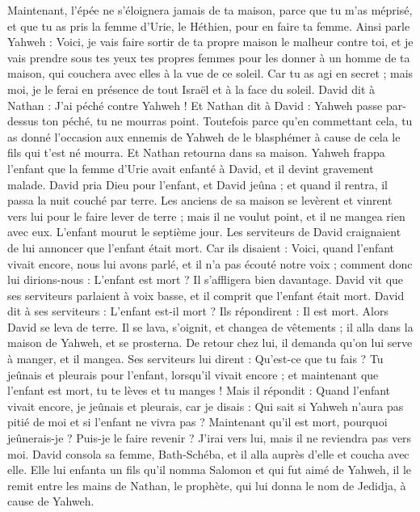 \begin{multicols}{2}
Maintenant, l'épée ne s’éloignera jamais de ta maison, parce que tu m'as méprisé, et que tu as pris la femme d'Urie, le Héthien, pour en faire ta femme.
Ainsi parle Yahweh : Voici, je vais faire sortir de ta propre maison le malheur contre toi, et je vais prendre sous tes yeux tes propres femmes pour les donner à un homme de ta maison, qui couchera avec elles à la vue de ce soleil.
Car tu as agi en secret ; mais moi, je le ferai en présence de tout Israël et à la face du soleil.
David dit à Nathan : J'ai péché contre Yahweh ! Et Nathan dit à David : Yahweh passe par-dessus ton péché, tu ne mourras point.
Toutefois parce qu'en commettant cela, tu as donné l'occasion aux ennemis de Yahweh de le blasphémer à cause de cela le fils qui t'est né mourra.
Et Nathan retourna dans sa maison. Yahweh frappa l'enfant que la femme d'Urie avait enfanté à David, et il devint gravement malade.
David pria Dieu pour l'enfant, et David jeûna ; et quand il rentra, il passa la nuit couché par terre.
Les anciens de sa maison se levèrent et vinrent vers lui pour le faire lever de terre ; mais il ne voulut point, et il ne mangea rien avec eux.
L'enfant mourut le septième jour. Les serviteurs de David craignaient de lui annoncer que l'enfant était mort. Car ils disaient : Voici, quand l'enfant vivait encore, nous lui avons parlé, et il n'a pas écouté notre voix ; comment donc lui dirions-nous : L'enfant est mort ? Il s'affligera bien davantage.
David vit que ses serviteurs parlaient à voix basse, et il comprit que l'enfant était mort. David dit à ses serviteurs : L'enfant est-il mort ? Ils répondirent : Il est mort.
Alors David se leva de terre. Il se lava, s'oignit, et changea de vêtements ; il alla dans la maison de Yahweh, et se prosterna. De retour chez lui, il demanda qu'on lui serve à manger, et il mangea.
Ses serviteurs lui dirent : Qu'est-ce que tu fais ? Tu jeûnais et pleurais pour l'enfant, lorsqu'il vivait encore ; et maintenant que l'enfant est mort, tu te lèves et tu manges !
Mais il répondit : Quand l'enfant vivait encore, je jeûnais et pleurais, car je disais : Qui sait si Yahweh n’aura pas pitié de moi et si l'enfant ne vivra pas ?
Maintenant qu'il est mort, pourquoi jeûnerais-je ? Puis-je le faire revenir ? J’irai vers lui, mais il ne reviendra pas vers moi.
David consola sa femme, Bath-Schéba, et il alla auprès d’elle et coucha avec elle. Elle lui enfanta un fils qu'il nomma Salomon et qui fut aimé de Yahweh,
il le remit entre les mains de Nathan, le prophète, qui lui donna le nom de Jedidja, à cause de Yahweh.

\end{multicols}
